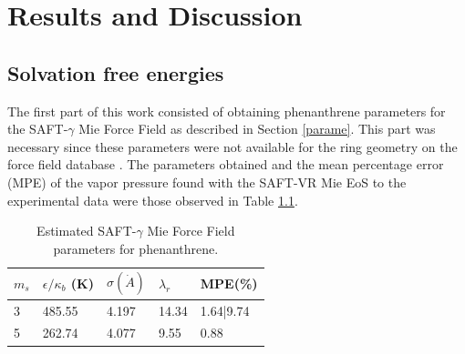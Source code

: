 \chapter{Results and Discussion} %

\label{Chapter5} %

\section{Solvation free energies}

The first part of this work consisted of obtaining phenanthrene parameters for the SAFT-$\gamma$ Mie Force Field as described in Section \ref{parame}. This part was necessary since these parameters were not available for the ring geometry on the force field database \cite{ervik2016}. The parameters obtained and the mean percentage error (MPE) of the vapor pressure found with the SAFT-VR Mie EoS to the experimental data \cite{pvphen} were those observed in Table \ref{tbl:estimparameters}.

\begin{table}[h]
    \centering
    \caption{Estimated SAFT-$\gamma$ Mie Force Field parameters for phenanthrene.}
    \label{tbl:estimparameters}
    \begin{tabular}{lllll}
    	\hline\hline
    	$m_s$                & $\epsilon/\kappa_{b}$ (K) & $\sigma (\dot{A})$ & $\lambda_r$ & MPE(\%)   \\ \hline
    	3 \cite{lafitte2012} & 485.55               & 4.197              & 14.34       & 1.64|9.74 \\
    	5  \cite{muller2017} & 262.74               & 4.077              & 9.55        & 0.88      \\ \hline\hline
    \end{tabular}
    
\end{table} 

